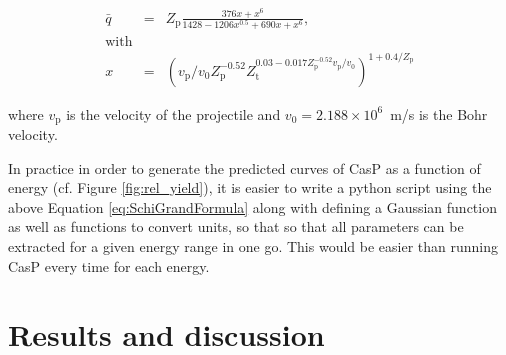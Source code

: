 \documentclass[a4paper,fleqn,review]{cas-sc}
\begin{document}
\begin{eqnarray}\label{eq:SchiGrandFormula}
\bar{q} & = & Z_\text{p} \frac{376x + x^6}{1428 - 1206x^{0.5} + 690x + x^6}, \nonumber \\ 
\text{with}&&  \\
x &=& \left(v_\text{p}/v_0 Z_\text{p}^{-0.52} Z_\text{t}^{0.03-0.017 Z_\text{p}^{-0.52} v_\text{p}/v_0}\right) ^{1+0.4/Z_\text{p}} \nonumber
\end{eqnarray}

where $v_\text{p}$ is the velocity of the projectile and $v_0 = 2.188\times10^6$~m/s is the Bohr velocity.

In practice in order to generate the predicted curves of CasP as a function of energy (cf. Figure  \ref{fig:rel_yield}), it is easier to write a python script using the above Equation \ref{eq:SchiGrandFormula} along with defining a Gaussian function as well as functions to convert units, so that so that all parameters can be extracted for a given energy range in one go. This would be easier than running CasP every time for each energy. 




\section{Results and discussion}

\end{document}
